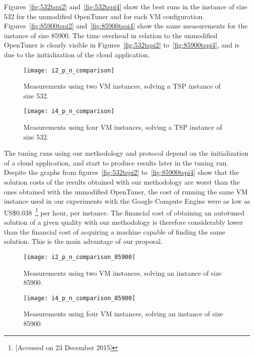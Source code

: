 Figures~\ref{fig:532tspi2} and~\ref{fig:532tspi4} show the best runs in the
instance of size 532 for the unmodified OpenTuner and for each VM
configuration.  Figures~\ref{fig:85900tspi2} and~\ref{fig:85900tspi4} show the
same measurements for the instance of size 85900.  The time overhead in
relation to the unmodified OpenTuner is clearly visible in
Figures~\ref{fig:532tspi2} to~\ref{fig:85900tspi4}, and is due to the
initialization of the cloud application.

\begin{figure}[htpb]
    \centering
    \begin{minipage}{.48\textwidth}
        \centering
        \texttt{[image: i2\_p\_n\_comparison]}
        \caption{Measurements using two VM instances, solving
                 a TSP instance of size 532.}
        \label{fig:532tspi2}
    \end{minipage}%
    \hfill
    \begin{minipage}{.48\textwidth}
        \centering
        \texttt{[image: i4\_p\_n\_comparison]}
        \caption{Measurements using four VM instances,
                 solving a TSP instance of size 532.}
        \label{fig:532tspi4}
    \end{minipage}%
    \label{fig:532tsp}
\end{figure}

The tuning runs using our methodology and protocol depend on the initialization
of a cloud application, and start to produce results later in the tuning run.
Despite the graphs from figures~\ref{fig:532tspi2} to~\ref{fig:85900tspi4} show
that the solution costs of the results obtained with our methodology are worst
than the ones obtained with the unmodified OpenTuner, the cost of running the
same VM instance used in our experiments with the Google Compute Engine were as
low as
US\$0.038~\footnote{
[Accessed on 23 December 2015]} per hour, per instance. The financial cost of
obtaining an autotuned solution of a given quality with our methodology is
therefore considerably lower than the financial cost of acquiring a machine
capable of finding the same solution. This is the main advantage of our
proposal.

\begin{figure}[htpb]
    \centering
    \begin{minipage}{.48\textwidth}
        \centering
        \texttt{[image: i2\_p\_n\_comparison\_85900]}
        \caption{Measurements using two VM instances,
                 solving an instance of size 85900.}
        \label{fig:85900tspi2}
    \end{minipage}%
    \hfill
    \begin{minipage}{.48\textwidth}
        \centering
        \texttt{[image: i4\_p\_n\_comparison\_85900]}
        \caption{Measurements using four VM instances,
                 solving an instance of size 85900.}
        \label{fig:85900tspi4}
    \end{minipage}%
    \label{fig:85900tsp}
\end{figure}

